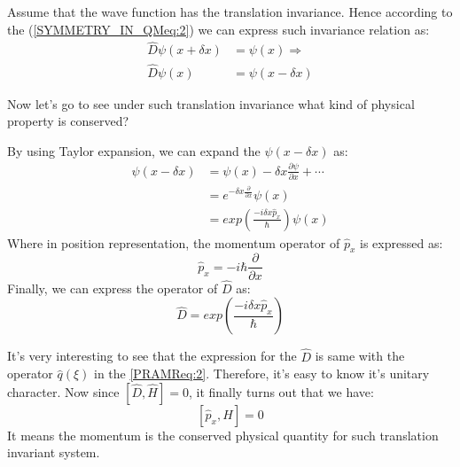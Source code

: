 Assume that the wave function has the translation invariance. Hence
according to the (\ref{SYMMETRY_IN_QMeq:2}) we can express such
invariance relation as:
\begin{equation}\label{}
\begin{split}
   \hat{D}\psi(x + \delta x) &= \psi(x) \Rightarrow \\
   \hat{D}\psi(x) &= \psi(x - \delta x)
\end{split}
\end{equation}

Now let's go to see under such translation invariance what kind of
physical property is conserved?

By using Taylor expansion, we can expand the $\psi(x - \delta x)$
as:
\begin{equation}\label{}
\begin{split}
  \psi(x - \delta x) &= \psi(x) -
\delta x\frac{\partial \psi}{\partial x} + \cdots \\
    &= e^{-\delta x \frac{\partial}{\partial x}} \psi(x) \\
    &= exp(\frac{-i \delta x \hat{p}_{x}}{\hbar}) \psi(x)
\end{split}
\end{equation}
Where in position representation, the momentum operator of
$\hat{p}_{x}$ is expressed as:
\begin{equation}\label{}
\hat{p}_{x} = -i\hbar\frac{\partial}{\partial x}
\end{equation}
Finally, we can express the operator of $\hat{D}$ as:
\begin{equation}\label{}
\hat{D} = exp(\frac{-i \delta x \hat{p}_{x}}{\hbar})
\end{equation}

It's very interesting to see that the expression for the $\hat{D}$
is same with the operator $\hat{q}(\xi)$ in the \ref{PRAMReq:2}.
Therefore, it's easy to know it's unitary character. Now since
$[\hat{D}, \hat{H}] = 0$, it finally turns out that we have:
\begin{equation}\label{}
[\hat{p}_{x}, \hat{H}] = 0
\end{equation}
It means the momentum is the conserved physical quantity for such
translation invariant system.








